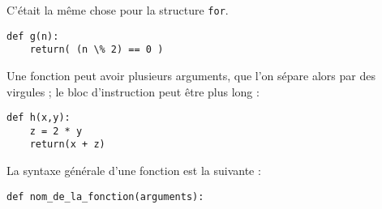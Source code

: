 \begin{multicols}{2}
C'était la même chose pour la structure \texttt{for}.






\begin{lstlisting}
def g(n):
    return( (n \% 2) == 0 )
\end{lstlisting}


Une fonction peut avoir plusieurs arguments, que l'on sépare alors par des virgules ; le bloc d'instruction peut être plus long : 
\begin{lstlisting}
def h(x,y):
    z = 2 * y
    return(x + z)
\end{lstlisting}

La syntaxe générale d'une fonction est la suivante : 
\begin{lstlisting}
def nom_de_la_fonction(arguments):
\end{lstlisting}


\exer{}







\ifprof
\else
\end{multicols}
\fi

